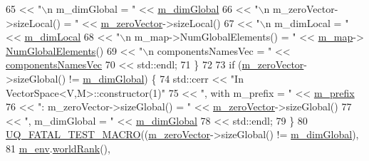 \begin{DoxyCode}
65                             << \textcolor{stringliteral}{"\(\backslash\)n  m\_dimGlobal                = "} << 
      \hyperlink{class_q_u_e_s_o_1_1_vector_space_ad3efef4a407fdc5c98fded11f2f2444e}{m\_dimGlobal}
66                             << \textcolor{stringliteral}{"\(\backslash\)n  m\_zeroVector->sizeLocal()  = "} << 
      \hyperlink{class_q_u_e_s_o_1_1_vector_space_a0faa184316e08edb286a1bd0a5059b10}{m\_zeroVector}->sizeLocal()
67                             << \textcolor{stringliteral}{"\(\backslash\)n  m\_dimLocal                 = "} << \hyperlink{class_q_u_e_s_o_1_1_vector_space_aa6db91aca8a1f79e27d2f472528850bb}{m\_dimLocal}
68                             << \textcolor{stringliteral}{"\(\backslash\)n  m\_map->NumGlobalElements() = "} << \hyperlink{class_q_u_e_s_o_1_1_vector_space_a752194a4dc937db4db4df2a3b207d3b9}{m\_map}->
      \hyperlink{class_q_u_e_s_o_1_1_map_ac67907266dcd7108ffe5a0cbef908781}{NumGlobalElements}()
69                             << \textcolor{stringliteral}{"\(\backslash\)n  componentsNamesVec         = "} << 
      \hyperlink{class_q_u_e_s_o_1_1_vector_space_aa315ff4efb4be69a64e341e3ebddca56}{componentsNamesVec}
70                             << std::endl;
71   \}
72  
73   \textcolor{keywordflow}{if} (\hyperlink{class_q_u_e_s_o_1_1_vector_space_a0faa184316e08edb286a1bd0a5059b10}{m\_zeroVector}->sizeGlobal() != \hyperlink{class_q_u_e_s_o_1_1_vector_space_ad3efef4a407fdc5c98fded11f2f2444e}{m\_dimGlobal}) \{
74     std::cerr << \textcolor{stringliteral}{"In VectorSpace<V,M>::constructor(1)"}
75               << \textcolor{stringliteral}{", with m\_prefix = "} << \hyperlink{class_q_u_e_s_o_1_1_vector_set_a472995c02b59c8f3cd77230b39535cca}{m\_prefix}
76               << \textcolor{stringliteral}{": m\_zeroVector->sizeGlobal() = "} << \hyperlink{class_q_u_e_s_o_1_1_vector_space_a0faa184316e08edb286a1bd0a5059b10}{m\_zeroVector}->sizeGlobal()
77               << \textcolor{stringliteral}{", m\_dimGlobal = "}                << \hyperlink{class_q_u_e_s_o_1_1_vector_space_ad3efef4a407fdc5c98fded11f2f2444e}{m\_dimGlobal}
78               << std::endl;
79   \}
80   \hyperlink{_defines_8h_a56d63d18d0a6d45757de47fcc06f574d}{UQ\_FATAL\_TEST\_MACRO}((\hyperlink{class_q_u_e_s_o_1_1_vector_space_a0faa184316e08edb286a1bd0a5059b10}{m\_zeroVector}->sizeGlobal() != 
      \hyperlink{class_q_u_e_s_o_1_1_vector_space_ad3efef4a407fdc5c98fded11f2f2444e}{m\_dimGlobal}),
81                       \hyperlink{class_q_u_e_s_o_1_1_vector_set_a77f3b57109bc1d89b4111f47458df770}{m\_env}.\hyperlink{class_q_u_e_s_o_1_1_base_environment_a78b57112bbd0e6dd0e8afec00b40ffa7}{worldRank}(),

\end{DoxyCode}
